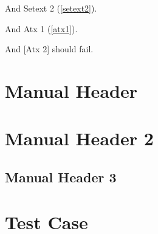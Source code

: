 And Setext 2 (\autoref{setext2}).

And Atx 1 (\autoref{atx1}).

And [Atx 2] should fail.

\chapter{Manual Header}
\label{label}

\chapter{Manual Header 2}
\label{label2}

\section{Manual Header 3}
\label{label3}

\chapter{Test Case}
\label{test}




